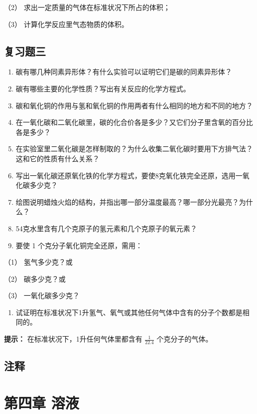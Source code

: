 （2） 求出一定质量的气体在标准状况下所占的体积；

（3） 计算化学反应里气态物质的体积。

\section{复习题三}

\begin{enumerate}
\item
  碳有哪几种同素异形体？有什么实验可以证明它们是碳的同素异形体？
\item
  碳有哪些主要的化学性质？写出有关反应的化学方程式。
\item
  碳和氧化铜的作用与氢和氧化铜的作用两者有什么相同的地方和不同的地方？
\item
  在一氧化碳和二氧化碳里，碳的化合价各是多少？又它们分子里含氧的百分比各是多少？
\item
  在实验室里二氧化碳是怎样制取的？为什么收集二氧化碳时要用下方排气法？这和它的性质有什么关系？
\item
  写出一氧化碳还原氧化铁的化学方程式，要使8克氧化铁完全还原，选用一氧化碳多少克？
\item
  绘图说明蜡烛火焰的结构，并指出哪一部分温度最高？哪一部分光最亮？为什么？
\item
  54克水里含有几个克原子的氢元素和几个克原子的氧元素？
\item
  要使 1 个克分子氧化铜完全还原，需用：
\end{enumerate}

（1） 氢气多少克？或

（2） 碳多少克？或

（3） 一氧化碳多少克？

\begin{enumerate}[start=10]
\item
  试证明在标准状况下1升氢气、氧气或其他任何气体中含有的分子个数都是相同的。
\end{enumerate}

\begin{shulihuadef}
\textbf{提示：} 在标准状况下，1升任何气体里都含有 \(\frac{1}{22.4}\)
个克分子的气体。
\end{shulihuadef}

\section{注释}

\chapter{第四章 溶液}

